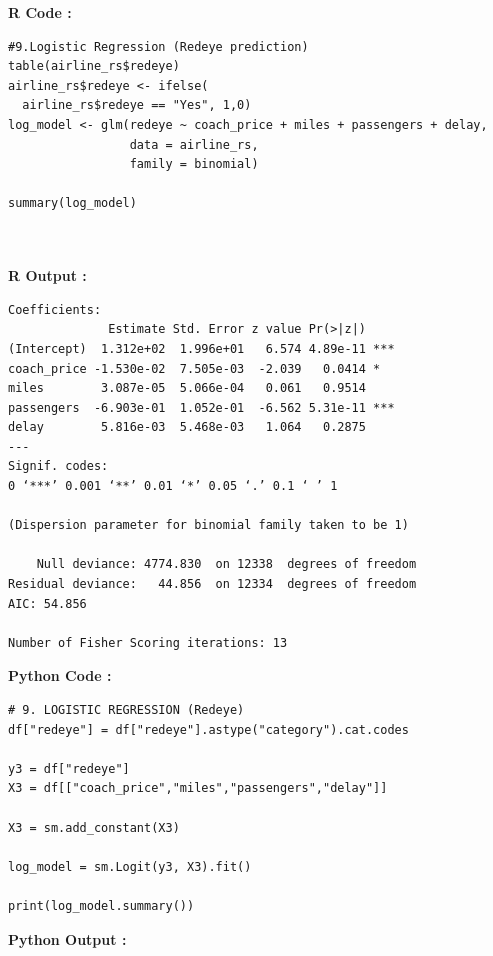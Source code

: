 \documentclass[11pt,a4paper]{article}
\begin{document}
\newpage
\noindent \textbf{R Code :}
\begin{codebox}
\begin{lstlisting}[style=Rstyle]
#9.Logistic Regression (Redeye prediction)
table(airline_rs$redeye)
airline_rs$redeye <- ifelse(
  airline_rs$redeye == "Yes", 1,0)
log_model <- glm(redeye ~ coach_price + miles + passengers + delay,
                 data = airline_rs,
                 family = binomial)

summary(log_model)



\end{lstlisting}
\end{codebox}

\vspace{0.5em}
\noindent \textbf{R Output :}

\begin{verbatim}
Coefficients:
              Estimate Std. Error z value Pr(>|z|)    
(Intercept)  1.312e+02  1.996e+01   6.574 4.89e-11 ***
coach_price -1.530e-02  7.505e-03  -2.039   0.0414 *  
miles        3.087e-05  5.066e-04   0.061   0.9514    
passengers  -6.903e-01  1.052e-01  -6.562 5.31e-11 ***
delay        5.816e-03  5.468e-03   1.064   0.2875    
---
Signif. codes:  
0 ‘***’ 0.001 ‘**’ 0.01 ‘*’ 0.05 ‘.’ 0.1 ‘ ’ 1

(Dispersion parameter for binomial family taken to be 1)

    Null deviance: 4774.830  on 12338  degrees of freedom
Residual deviance:   44.856  on 12334  degrees of freedom
AIC: 54.856

Number of Fisher Scoring iterations: 13

\end{verbatim}
\vspace{0.5em}
\noindent \textbf{Python Code :}
\begin{codebox}
\begin{lstlisting}[style=Pythonstyle]
# 9. LOGISTIC REGRESSION (Redeye)
df["redeye"] = df["redeye"].astype("category").cat.codes

y3 = df["redeye"]
X3 = df[["coach_price","miles","passengers","delay"]]

X3 = sm.add_constant(X3)

log_model = sm.Logit(y3, X3).fit()

print(log_model.summary())
\end{lstlisting}
\end{codebox}
\vspace{0.5em}
\noindent \textbf{Python Output :}
\end{document}
